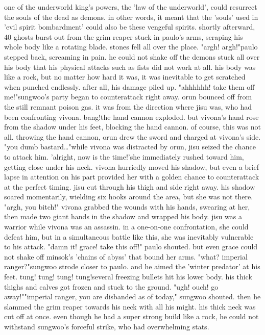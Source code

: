 one of the underworld king's powers, the 'law of the underworld', could resurrect the souls of the dead as demons.
 in other words, it meant that the 'souls' used in 'evil spirit bombardment' could also be these vengeful spirits.
shortly afterward, 40 ghosts burst out from the grim reaper stuck in paulo's arms, scraping his whole body like a rotating blade.
 stones fell all over the place.
"argh! argh!"paulo stepped back, screaming in pain.
 he could not shake off the demons stuck all over his body that his physical attacks such as fists did not work at all.
 his body was like a rock, but no matter how hard it was, it was inevitable to get scratched when punched endlessly.
 after all, his damage piled up.
"ahhhhhh! take them off me!"sungwoo's party began to counterattack right away.
 orun bounced off from the still remnant poison gas.
 it was from the direction where jisu was, who had been confronting vivona.
bang!the hand cannon exploded.
 but vivona's hand rose from the shadow under his feet, blocking the hand cannon.
 of course, this was not all.
 throwing the hand cannon, orun drew the sword and charged at vivona's side.
 "you dumb bastard…"while vivona was distracted by orun, jisu seized the chance to attack him.
'alright, now is the time!'she immediately rushed toward him, getting close under his neck.
vivona hurriedly moved his shadow, but even a brief lapse in attention on his part provided her with a golden chance to counterattack at the perfect timing.
jisu cut through his thigh and side right away.
his shadow soared momentarily, wielding six hooks around the area, but she was not there.
 "argh, you bitch!"
vivona grabbed the wounds with his hands, swearing at her, then made two giant hands in the shadow and wrapped his body.
jisu was a warrior while vivona was an assassin.
 in a one-on-one confrontation, she could defeat him, but in a simultaneous battle like this, she was inevitably vulnerable to his attack.
"damn it! grace! take this off!" paulo shouted.
but even grace could not shake off minsok's 'chains of abyss' that bound her arms.
"what? imperial ranger?"sungwoo strode closer to paulo.
 and he aimed the 'winter predator' at his feet.
tung! tung! tung! tung!several freezing bullets hit his lower body.
his thick thighs and calves got frozen and stuck to the ground.
 "ugh! ouch! go away!""imperial ranger, you are disbanded as of today," sungwoo shouted.
then he slammed the grim reaper towards his neck with all his might.
his thick neck was cut off at once.
 even though he had a super strong build like a rock, he could not withstand sungwoo's forceful strike, who had overwhelming stats.
